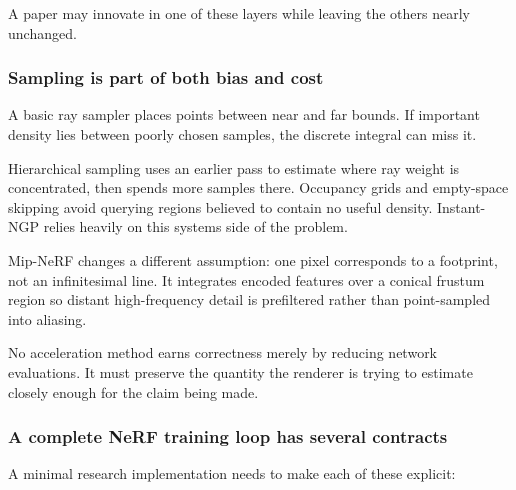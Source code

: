 A paper may innovate in one of these layers while leaving the others nearly unchanged.

\subsubsection{Sampling is part of both bias and cost}\label{sampling-is-part-of-both-bias-and-cost}

A basic ray sampler places points between near and far bounds. If important density lies between poorly chosen samples, the discrete integral can miss it.

Hierarchical sampling uses an earlier pass to estimate where ray weight is concentrated, then spends more samples there. Occupancy grids and empty-space skipping avoid querying regions believed to contain no useful density. Instant-NGP relies heavily on this systems side of the problem.

Mip-NeRF changes a different assumption: one pixel corresponds to a footprint, not an infinitesimal line. It integrates encoded features over a conical frustum region so distant high-frequency detail is prefiltered rather than point-sampled into aliasing.

No acceleration method earns correctness merely by reducing network evaluations. It must preserve the quantity the renderer is trying to estimate closely enough for the claim being made.

\subsubsection{A complete NeRF training loop has several contracts}\label{a-complete-nerf-training-loop-has-several-contracts}

A minimal research implementation needs to make each of these explicit:


